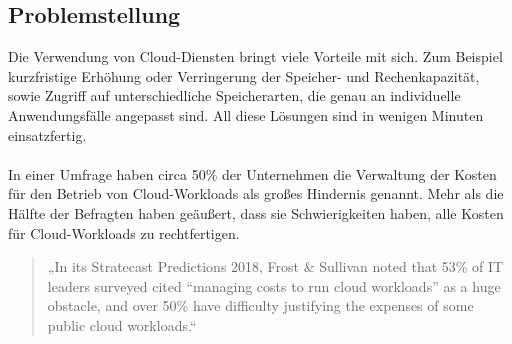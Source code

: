 \subsection{Problemstellung}

\begin{comment}
\\\\
”Heute hatten wir 17 Gäste für unsere derzeit 20 Zimmer. Für die kommende Messe am Wochenende sind wir bereit 500 Gäste zu empfangen. Nach der Messe werden wir mit unseren üblichen 20 Zimmern wie immer gut arbeiten können.”
Normalerweise bräuchte man eine große Investition zu machen, um solche kurzfristige Nachfrage zu erfüllen. Vergleichbar ist es bei traditionellen IT-Infrastrukturen, mehr Kapazitätsbedarf, würde die Anschaffung von einer neuen Hardware bedeuten.
\\\\
\end{comment}
Die Verwendung von Cloud-Diensten bringt viele Vorteile mit sich. Zum Beispiel kurzfristige Erhöhung oder Verringerung der Speicher- und Rechenkapazität, sowie Zugriff auf unterschiedliche Speicherarten, die genau an individuelle Anwendungsfälle angepasst sind. All diese Lösungen sind in wenigen Minuten einsatzfertig. 
\\\\
In einer Umfrage haben circa 50\% der Unternehmen die Verwaltung der Kosten für den Betrieb von Cloud-Workloads als großes Hindernis genannt. Mehr als die Hälfte der Befragten haben geäußert, dass sie Schwierigkeiten haben, alle Kosten für Cloud-Workloads zu rechtfertigen.
\begin{quote}
    „In its Stratecast Predictions 2018, Frost \& Sullivan noted that 53\% of IT leaders surveyed cited “managing costs to run cloud workloads” as a huge obstacle, and over 50\% have difficulty justifying the expenses of some public cloud workloads.“  
    {\cite{SP1}}
    \end{quote}

